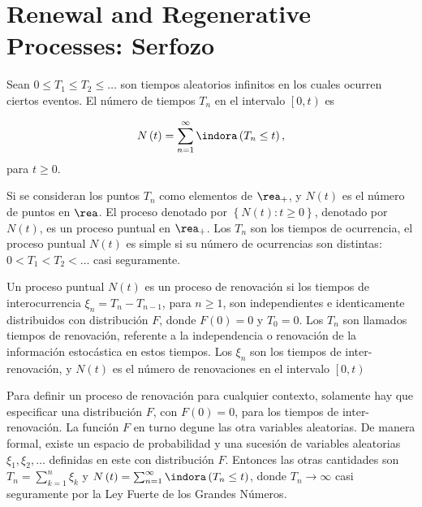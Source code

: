 %
\section{Renewal and Regenerative Processes: Serfozo\cite{Serfozo}}
%
\begin{Def}\label{Def.Tn}
Sean $0\leq T_{1}\leq T_{2}\leq \ldots$ son tiempos aleatorios infinitos en los cuales ocurren ciertos eventos. El n\'umero de tiempos $T_{n}$ en el intervalo $\left[0,t\right)$ es

\begin{eqnarray}
N\left(t\right)=\sum_{n=1}^{\infty}\indora\left(T_{n}\leq t\right),
\end{eqnarray}
para $t\geq0$.
\end{Def}

Si se consideran los puntos $T_{n}$ como elementos de $\rea_{+}$, y $N\left(t\right)$ es el n\'umero de puntos en $\rea$. El proceso denotado por $\left\{N\left(t\right):t\geq0\right\}$, denotado por $N\left(t\right)$, es un proceso puntual en $\rea_{+}$. Los $T_{n}$ son los tiempos de ocurrencia, el proceso puntual $N\left(t\right)$ es simple si su n\'umero de ocurrencias son distintas: $0<T_{1}<T_{2}<\ldots$ casi seguramente.

\begin{Def}
Un proceso puntual $N\left(t\right)$ es un proceso de renovaci\'on si los tiempos de interocurrencia $\xi_{n}=T_{n}-T_{n-1}$, para $n\geq1$, son independientes e identicamente distribuidos con distribuci\'on $F$, donde $F\left(0\right)=0$ y $T_{0}=0$. Los $T_{n}$ son llamados tiempos de renovaci\'on, referente a la independencia o renovaci\'on de la informaci\'on estoc\'astica en estos tiempos. Los $\xi_{n}$ son los tiempos de inter-renovaci\'on, y $N\left(t\right)$ es el n\'umero de renovaciones en el intervalo $\left[0,t\right)$
\end{Def}


\begin{Note}
Para definir un proceso de renovaci\'on para cualquier contexto, solamente hay que especificar una distribuci\'on $F$, con $F\left(0\right)=0$, para los tiempos de inter-renovaci\'on. La funci\'on $F$ en turno degune las otra variables aleatorias. De manera formal, existe un espacio de probabilidad y una sucesi\'on de variables aleatorias $\xi_{1},\xi_{2},\ldots$ definidas en este con distribuci\'on $F$. Entonces las otras cantidades son $T_{n}=\sum_{k=1}^{n}\xi_{k}$ y $N\left(t\right)=\sum_{n=1}^{\infty}\indora\left(T_{n}\leq t\right)$, donde $T_{n}\rightarrow\infty$ casi seguramente por la Ley Fuerte de los Grandes N\'umeros.
\end{Note}







